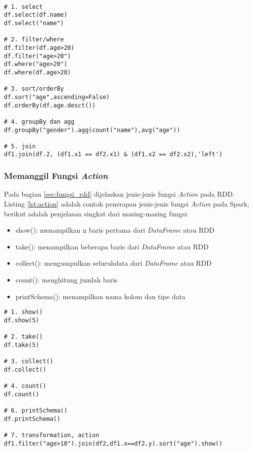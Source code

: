\begin{lstlisting}[basicstyle=\ttfamily, frame=single,
	columns=fullflexible, keepspaces=true, breaklines=true, label=lst:transformation, caption=Contoh Fungsi Transformation]
	
# 1. select
df.select(df.name)
df.select("name")

# 2. filter/where
df.filter(df.age>20)
df.filter("age>20")
df.where("age>20")
df.where(df.age>20)
 
# 3. sort/orderBy 
df.sort("age",ascending=False)
df.orderBy(df.age.desct())
 
# 4. groupBy dan agg
df.groupBy("gender").agg(count("name"),avg("age"))

# 5. join
df1.join(df.2, (df1.x1 == df2.x1) & (df1.x2 == df2.x2),'left')

\end{lstlisting}

\subsubsection{Memanggil Fungsi \textit{Action}}
\noindent Pada bagian \ref{sec:fungsi_rdd} dijelaskan jenis-jenis fungsi \textit{Action} pada RDD. Listing \ref{lst:action} adalah contoh penerapan jenis-jenis fungsi \textit{Action} pada Spark, berikut adalah penjelasan singkat dari masing-masing fungsi:
\begin{itemize}
\item show(): menampilkan n baris pertama dari \textit{DataFrame} atau RDD
\item take(): menampilkan beberapa baris dari \textit{DataFrame} atau RDD
\item collect(): mengumpulkan seluruhdata dari \textit{DataFrame} atau RDD 
\item count(): menghitung jumlah baris
\item printSchema(): menampilkan nama kolom dan tipe data
\end{itemize}

\begin{lstlisting}[basicstyle=\ttfamily, frame=single,
	columns=fullflexible, keepspaces=true, breaklines=true, label=lst:action, caption=Contoh Fungsi Action]
# 1. show()
df.show(5)

# 2. take()
df.take(5)

# 3. collect()
df.collect()

# 4. count()
df.count()

# 6. printSchema()
df.printSchema()

# 7. transformation, action
df1.filter("age>10").join(df2,df1.x==df2.y).sort("age").show()


\end{lstlisting}

